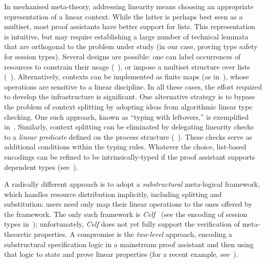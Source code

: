 \documentclass[runningheads]{llncs}
\begin{document}
In mechanised meta-theory, addressing linearity means choosing an appropriate
representation of a linear context.  While the latter  is perhaps
best seen as a multiset, most proof assistants have better support for lists.
This representation is intuitive, but may require
establishing a large number of technical lemmata that are orthogonal to the
problem under study (in our case, proving type safety for session types).
Several designs are possible: one can label
occurrences of resources to constrain their usage (\eg~\cite{CicconeP20}), or impose a multiset structure over lists
(\eg~\cite{Danielsson12,ChaudhuriLR19}). Alternatively, contexts can be
implemented as finite maps (as in~\cite{Castro2020}), whose operations are
sensitive to a linear discipline. In all these cases, the effort required to
develop the infrastructure is significant.
One alternative strategy is to bypass the problem of context splitting
by adopting ideas from algorithmic linear type checking. One such
approach, known as ``typing with leftovers,'' is exemplified
in~\cite{DBLP:conf/forte/ZalakainD21}.
Similarly, context splitting can be eliminated by delegating linearity checks to a
\emph{linear predicate} defined on the process structure (\eg~\cite{BP23}).
These checks serve as additional conditions within the typing rules.
Whatever the choice, list-based encodings can be refined to be intrinsically-typed if the
proof assistant supports dependent types
(see~\cite{Thiemann2019,CicconeP20,RouvoetPKV20}).

A radically different approach is to adopt a \emph{substructural}
meta-logical framework, which handles resource
distribution implicitly, including splitting and
substitution: users need only map their linear operations to the
ones offered by the framework.  The only such framework is
\emph{Celf}~\cite{Schack-Nielsen:IJCAR08} (see the encoding of session
types in~\cite{Bock2016}); unfortunately, \emph{Celf} does not yet
fully support the verification of meta-theoretic properties.  A
compromise is the \emph{two-level} approach, \ie encoding a
substructural specification logic in a mainstream proof assistant and
then using that logic to state and prove linear properties (for a
recent example, see~\cite{Felty:MSCS21}). 
\end{document}
